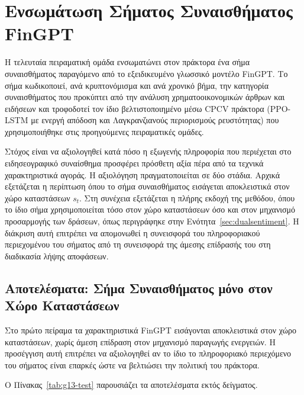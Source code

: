 \section{Ενσωμάτωση Σήματος Συναισθήματος FinGPT}
\label{sec:exp-sentiment}

Η τελευταία πειραματική ομάδα ενσωματώνει στον πράκτορα ένα σήμα συναισθήματος παραγόμενο από το εξειδικευμένο
γλωσσικό μοντέλο FinGPT. Το σήμα κωδικοποιεί, ανά κρυπτονόμισμα και ανά χρονικό βήμα, την κατηγορία
συναισθήματος που προκύπτει από την ανάλυση χρηματοοικονομικών άρθρων και ειδήσεων και τροφοδοτεί τον
ίδιο βελτιστοποιημένο μέσω CPCV πράκτορα (PPO-LSTM με ενεργή απόδοση και Λαγκρανζιανούς περιορισμούς
ρευστότητας) που χρησιμοποιήθηκε στις προηγούμενες πειραματικές ομάδες.

Στόχος είναι να αξιολογηθεί κατά πόσο η εξωγενής πληροφορία που περιέχεται στο ειδησεογραφικό συναίσθημα
προσφέρει πρόσθετη αξία πέρα από τα τεχνικά χαρακτηριστικά αγοράς. Η αξιολόγηση πραγματοποιείται σε δύο
στάδια. Αρχικά εξετάζεται η περίπτωση όπου το σήμα συναισθήματος εισάγεται αποκλειστικά στον χώρο
καταστάσεων $s_t$. Στη συνέχεια εξετάζεται η πλήρης εκδοχή της μεθόδου, όπου το ίδιο σήμα χρησιμοποιείται
τόσο στον χώρο καταστάσεων όσο και στον μηχανισμό προσαρμογής των δράσεων, όπως περιγράφηκε στην
Ενότητα~\ref{sec:dualsentiment}. Η διάκριση αυτή επιτρέπει να απομονωθεί η συνεισφορά του πληροφοριακού
περιεχομένου του σήματος από τη συνεισφορά της άμεσης επίδρασής του στη διαδικασία λήψης αποφάσεων.

\subsection{Αποτελέσματα: Σήμα Συναισθήματος μόνο στον Χώρο Καταστάσεων}
\label{subsec:exp-sentiment-results}

Στο πρώτο πείραμα τα χαρακτηριστικά FinGPT εισάγονται αποκλειστικά στον χώρο καταστάσεων, χωρίς άμεση
επίδραση στον μηχανισμό παραγωγής ενεργειών. Η προσέγγιση αυτή επιτρέπει να αξιολογηθεί αν το ίδιο το
πληροφοριακό περιεχόμενο του σήματος είναι επαρκές ώστε να βελτιώσει την πολιτική του πράκτορα.

Ο Πίνακας~\ref{tab:g13-test} παρουσιάζει τα αποτελέσματα εκτός δείγματος.

